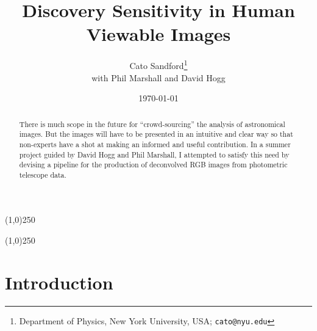 \documentclass[letterpaper, 11pt]{article}
\title{Discovery Sensitivity in Human Viewable Images}
\author{Cato Sandford\thanks{Department of Physics, New York University, USA; \texttt{cato@nyu.edu}}\\ \small with Phil Marshall and David Hogg}
\date{\today}
\begin{document}
\maketitle
\vspace{1cm}


\begin{abstract}
There is much scope in the future for ``crowd-sourcing'' the analysis of astronomical images. But the images will have to be presented in an intuitive and clear way so that non-experts have a shot at making an informed and useful contribution. In a summer project guided by David Hogg and Phil Marshall, I attempted to satisfy this need by devising a pipeline for the production of deconvolved RGB images from photometric telescope data.
\end{abstract}


\begin{center}
\line(1,0){250}
\end{center}
\vspace{-0.5cm}
\tableofcontents
\vspace{-0.1cm}
\begin{center}
\line(1,0){250}
\end{center}
\newpage



\section{Introduction}
\label{sec:intro}
\end{document}

